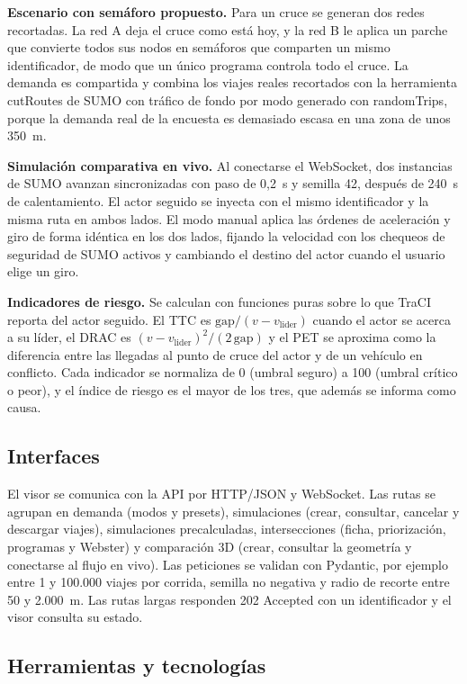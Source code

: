 \textbf{Escenario con semáforo propuesto.} Para un cruce se generan dos redes recortadas. La red A deja el cruce como está hoy, y la red B le aplica un parche que convierte todos sus nodos en semáforos que comparten un mismo identificador, de modo que un único programa controla todo el cruce. La demanda es compartida y combina los viajes reales recortados con la herramienta cutRoutes de SUMO con tráfico de fondo por modo generado con randomTrips, porque la demanda real de la encuesta es demasiado escasa en una zona de unos 350~m.

\textbf{Simulación comparativa en vivo.} Al conectarse el WebSocket, dos instancias de SUMO avanzan sincronizadas con paso de 0,2~s y semilla 42, después de 240~s de calentamiento. El actor seguido se inyecta con el mismo identificador y la misma ruta en ambos lados. El modo manual aplica las órdenes de aceleración y giro de forma idéntica en los dos lados, fijando la velocidad con los chequeos de seguridad de SUMO activos y cambiando el destino del actor cuando el usuario elige un giro.

\textbf{Indicadores de riesgo.} Se calculan con funciones puras sobre lo que TraCI reporta del actor seguido. El TTC es $\mathrm{gap}/(v - v_{\mathrm{lider}})$ cuando el actor se acerca a su líder, el DRAC es $(v - v_{\mathrm{lider}})^2/(2\,\mathrm{gap})$ y el PET se aproxima como la diferencia entre las llegadas al punto de cruce del actor y de un vehículo en conflicto. Cada indicador se normaliza de 0 (umbral seguro) a 100 (umbral crítico o peor), y el índice de riesgo es el mayor de los tres, que además se informa como causa.

\subsection{Interfaces}

El visor se comunica con la API por HTTP/JSON y WebSocket. Las rutas se agrupan en demanda (modos y presets), simulaciones (crear, consultar, cancelar y descargar viajes), simulaciones precalculadas, intersecciones (ficha, priorización, programas y Webster) y comparación 3D (crear, consultar la geometría y conectarse al flujo en vivo). Las peticiones se validan con Pydantic, por ejemplo entre 1 y 100.000 viajes por corrida, semilla no negativa y radio de recorte entre 50 y 2.000~m. Las rutas largas responden 202 Accepted con un identificador y el visor consulta su estado.

\subsection{Herramientas y tecnologías}

